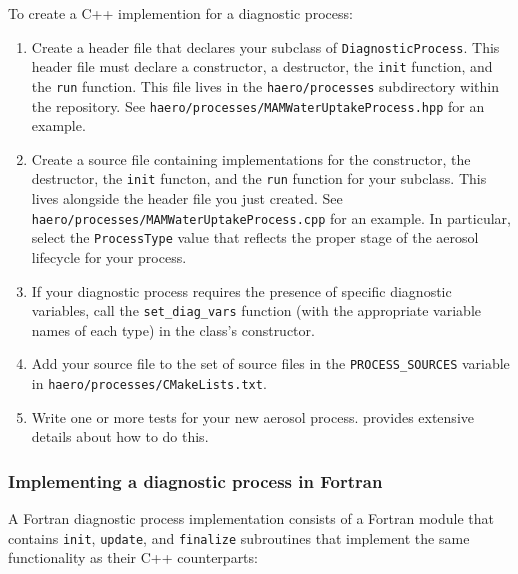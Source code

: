 To create a C++ implemention for a diagnostic process:

\begin{enumerate}
  \item Create a header file that declares your subclass of
        \texttt{DiagnosticProcess}. This header file must declare a constructor,
        a destructor, the \texttt{init} function, and the \texttt{run} function.
        This file lives in the \texttt{haero/processes} subdirectory within the
        repository. See \texttt{haero/processes/MAMWaterUptakeProcess.hpp} for an
        example.
  \item Create a source file containing implementations for the constructor, the
        destructor, the \texttt{init} functon, and the \texttt{run} function for
        your subclass. This lives alongside the header file you just created.
        See \texttt{haero/processes/MAMWaterUptakeProcess.cpp} for an example.
        In particular, select the \texttt{ProcessType} value that reflects the
        proper stage of the aerosol lifecycle for your process.
  \item If your diagnostic process requires the presence of specific diagnostic
        variables, call the \texttt{set\_diag\_vars} function (with the appropriate
        variable names of each type) in the class's constructor.
  \item Add your source file to the set of source files in the
        \texttt{PROCESS\_SOURCES} variable in \texttt{haero/processes/CMakeLists.txt}.
  \item Write one or more tests for your new aerosol process.
         provides extensive details about how to do this.
\end{enumerate}

\subsubsection{Implementing a diagnostic process in Fortran}

A Fortran diagnostic process implementation consists of a Fortran module that
contains \texttt{init}, \texttt{update}, and \texttt{finalize} subroutines that implement
the same functionality as their C++ counterparts:

